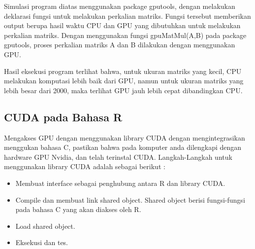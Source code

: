 Simulasi program diatas menggunakan package gputools, dengan melakukan deklarasi fungsi untuk melakukan perkalian matriks. Fungsi tersebut memberikan output berupa hasil waktu CPU dan GPU yang dibutuhkan untuk melakukan perkalian matriks. Dengan menggunakan fungsi gpuMatMul(A,B) pada package gputools, proses perkalian matriks A dan B dilakukan dengan menggunakan GPU.

Hasil eksekusi program terlihat bahwa, untuk ukuran matriks yang kecil, CPU melakukan komputasi  lebih baik dari GPU, namun untuk ukuran matriks yang lebih besar dari 2000, maka terlihat GPU jauh lebih cepat dibandingkan CPU.

\subsection{CUDA pada Bahasa R}

Mengakses GPU dengan menggunakan library CUDA dengan mengintegrasikan menggukan bahasa C, pastikan bahwa pada komputer anda dilengkapi dengan hardware GPU Nvidia, dan telah terinstal CUDA. Langkah-Langkah untuk menggunakan library CUDA adalah sebagai berikut :

\begin{itemize}
\item Membuat interface sebagai penghubung antara R dan library CUDA.
\item Compile dan membuat link shared object. Shared object berisi fungsi-fungsi pada bahasa C yang akan diakses oleh R.
\item Load shared object.
\item Eksekusi dan tes.
\end{itemize}
